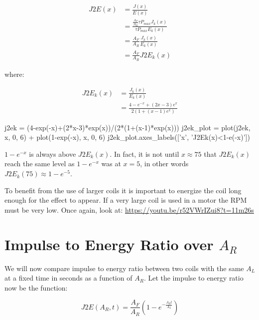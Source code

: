 \documentclass[]{elementary-physics}
\begin{document}
\begin{subequations}
\begin{align}
J2E(x) &= \frac{J(x)}{E(x)} \\
&= \frac{\frac{A_F}{A_R} \tau P_{max} J_k(x)}{\tau P_{max} E_k(x)} \\
&= \frac{A_F}{A_R} \frac{J_k(x)}{E_k(x)} \\
&= \frac{A_F}{A_R} J2E_k(x)
\end{align}
\end{subequations}

where:

\begin{subequations}
\begin{align}
J2E_k(x) &= \frac{J_k(x)}{E_k(x)} \\
&= \frac{4-e^{-x}+(2x-3)e^x}{2(1+(x-1)e^x)}
\end{align}
\end{subequations}

\begin{sagesilent}
j2ek = (4-exp(-x)+(2*x-3)*exp(x))/(2*(1+(x-1)*exp(x)))
j2ek_plot = plot(j2ek, x, 0, 6) + plot(1-exp(-x), x, 0, 6)
j2ek_plot.axes_labels(['x', 'J2Ek(x)<1-e(-x)'])
\end{sagesilent}


$1-e^{-x}$ is always above $J2E_k(x)$.
In fact, it is not until $x \approx 75$ that $J2E_k(x)$ reach the same level as $1-e^{-x}$ was at $x = 5$, in other words $J2E_k(75) \approx 1-e^{-5}$.

To benefit from the use of larger coils it is important to energize the coil long enough for the effect to appear.
If a very large coil is used in a motor the RPM must be very low.
Once again, look at: \url{https://youtu.be/r52VWrIZui8?t=11m26s}

\section{Impulse to Energy Ratio over $A_R$}

We will now compare impulse to energy ratio between two coils with the same $A_L$ at a fixed time in seconds as a function of $A_R$. Let the impulse to energy ratio now be the function:

\begin{equation}
J2E(A_R,t) = \frac{A_F}{A_R} (1 - e^{- \frac{A_R t}{A_L}})
\end{equation}
\end{document}
